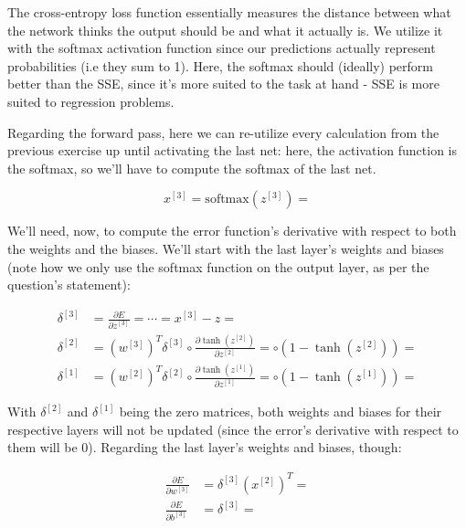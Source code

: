 \documentclass[12pt]{article}
\begin{document}
\begin{enumerate}[leftmargin=\labelsep]
  The cross-entropy loss function essentially measures the distance between what the
  network thinks the output should be and what it actually is. We utilize it with
  the softmax activation function since our predictions actually represent probabilities
  (i.e they sum to 1). Here, the softmax should (ideally) perform better than the SSE,
  since it's more suited to the task at hand - SSE is more suited to regression problems.

  Regarding the forward pass, here we can re-utilize every calculation from the previous
  exercise up until activating the last net: here, the activation function is the softmax,
  so we'll have to compute the softmax of the last net.

  \begin{equation*}
    x^{[3]} = \text{softmax}(z^{[3]}) = 
  \end{equation*}

  We'll need, now, to compute the error function's derivative with respect to both
  the weights and the biases. We'll start with the last layer's weights and biases
  (note how we only use the softmax function on the output layer, as per the question's
  statement):

  \begin{equation*}
    \begin{aligned}
      \delta^{[3]} & = \frac{\partial E}{\partial z^{[3]}} = \cdots = x^{[3]} - z =                                                                                        \\
      \delta^{[2]} & = (w^{[3]})^T \delta^{[3]} \circ \frac{\partial \tanh(z^{[2]})}{\partial z^{[2]}} =  \circ (1 - \tanh(z^{[2]})) =  \\
      \delta^{[1]} & = (w^{[2]})^T \delta^{[2]} \circ \frac{\partial \tanh(z^{[1]})}{\partial z^{[1]}} =  \circ (1 - \tanh(z^{[1]})) = 
    \end{aligned}
  \end{equation*}

  With $\delta^{[2]}$ and $\delta^{[1]}$ being the zero matrices, both weights and
  biases for their respective layers will not be updated (since the error's derivative
  with respect to them will be 0). Regarding the last layer's weights and biases, though:

  \begin{equation*}
    \begin{aligned}
      \frac{\partial E}{\partial w^{[3]}} & = \delta^{[3]} (x^{[2]})^T =                           \\
      \frac{\partial E}{\partial b^{[3]}} & = \delta^{[3]}  = 
    \end{aligned}
  \end{equation*}


\end{enumerate}
\end{document}
